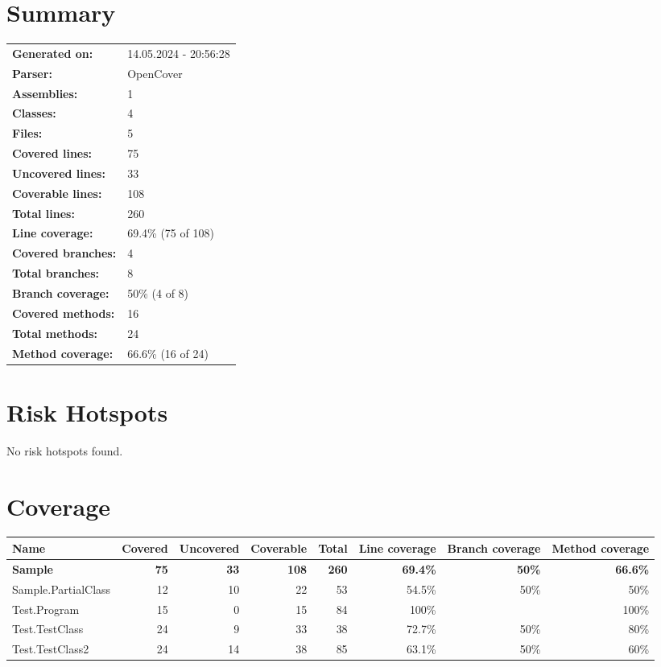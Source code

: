 \documentclass[a4paper,landscape,10pt]{article}
\begin{document}
\setcounter{secnumdepth}{-1}
\section{Summary}
\begin{longtable}[l]{ll}
\textbf{Generated on:} & 14.05.2024 - 20:56:28\\
\textbf{Parser:} & OpenCover\\
\textbf{Assemblies:} & 1\\
\textbf{Classes:} & 4\\
\textbf{Files:} & 5\\
\textbf{Covered lines:} & 75\\
\textbf{Uncovered lines:} & 33\\
\textbf{Coverable lines:} & 108\\
\textbf{Total lines:} & 260\\
\textbf{Line coverage:} & 69.4\% (75 of 108)\\
\textbf{Covered branches:} & 4\\
\textbf{Total branches:} & 8\\
\textbf{Branch coverage:} & 50\% (4 of 8)\\
\textbf{Covered methods:} & 16\\
\textbf{Total methods:} & 24\\
\textbf{Method coverage:} & 66.6\% (16 of 24)\\
\end{longtable}
\section{Risk Hotspots}
No risk hotspots found.
\section{Coverage}
\begin{longtable}[l]{|l|r|r|r|r|r|r|r|}
\hline
\textbf{Name} & \textbf{Covered} & \textbf{Uncovered} & \textbf{Coverable} & \textbf{Total} & \textbf{Line coverage} & \textbf{Branch coverage} & \textbf{Method coverage}\\
\hline
\textbf{Sample} & \textbf{75} & \textbf{33} & \textbf{108} & \textbf{260} & \textbf{69.4\%} & \textbf{50\%} & \textbf{66.6\%}\\
\hline
Sample.PartialClass & 12 & 10 & 22 & 53 & 54.5\% & 50\% & 50\%\\
\hline
Test.Program & 15 & 0 & 15 & 84 & 100\% &  & 100\%\\
\hline
Test.TestClass & 24 & 9 & 33 & 38 & 72.7\% & 50\% & 80\%\\
\hline
Test.TestClass2 & 24 & 14 & 38 & 85 & 63.1\% & 50\% & 60\%\\
\hline
\end{longtable}
\newpage
\end{document}
